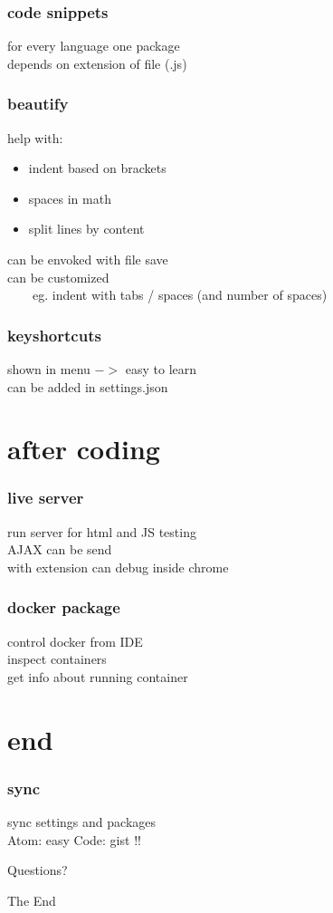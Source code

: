 \documentclass{beamer}
\begin{document}
\begin{frame}
\frametitle{code snippets}
for every language one package\\
depends on extension of file (.js) 
\end{frame}

\begin{frame}
\frametitle{beautify}
help with:
\begin{itemize}
\item indent based on brackets
\item spaces in math
\item split lines by content
\end{itemize}
can be envoked with file save\\
can be customized\\
~~~~eg. indent with tabs / spaces (and number of spaces)
\end{frame}

\begin{frame}
\frametitle{keyshortcuts}
shown in menu $->$ easy to learn\\
can be added in settings.json
\end{frame}

\section{after coding}
\begin{frame}
\frametitle{live server}
run server for html and JS testing\\
AJAX can be send\\
with extension can debug inside chrome
\end{frame}

\begin{frame}
\frametitle{docker package}
control docker from IDE\\
inspect containers\\
get info about running container
\end{frame}


\section{end}
\begin{frame}
\frametitle{sync}
sync settings and packages\\
Atom: easy
Code: gist !!
\end{frame}

\begin{frame}
\Huge{\centerline{Questions?}}
\end{frame}

\begin{frame}
\Huge{\centerline{The End}}
\end{frame}
\end{document}
